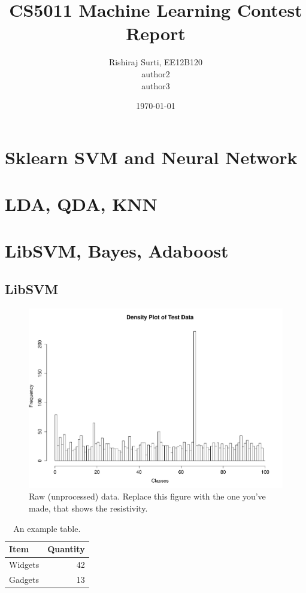 \documentclass[a4paper]{article}
\title{CS5011 Machine Learning Contest Report}
\author{Rishiraj Surti, EE12B120\\
	author2\\
	author3\\}
\date{\today}
\begin{document}
\maketitle

\section{Sklearn SVM and Neural Network}

\section{LDA, QDA, KNN}

\section{LibSVM, Bayes, Adaboost}
\subsection{LibSVM}

\begin{figure}
\centering
\includegraphics[width=1\textwidth]{../plots/TestData_targets.pdf}
\caption{\label{fig:data}Raw (unprocessed) data. Replace this figure with the one you've made, that shows the resistivity.}
\end{figure}

\begin{table}
\centering
\begin{tabular}{l|r}
Item & Quantity \\\hline
Widgets & 42 \\
Gadgets & 13
\end{tabular}
\caption{\label{tab:widgets}An example table.}
\end{table}
\end{document}
